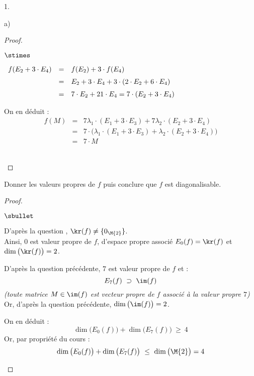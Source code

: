 \documentclass[11pt]{article}%
\begin{document}
\begin{noliste}{1.}
\begin{noliste}{a)}
\begin{proof}
\begin{noliste}{$\stimes$}
      \item $
        \begin{array}[t]{rcl}
          f(E_2 + 3 \cdot E_4) & = & f(E_2) + 3 \cdot f(E_4) 
          \\[.2cm]
          & = & E_2 + 3 \cdot E_4 + 3 \cdot (2 \cdot E_2 + 6 \cdot
          E_4) 
          \\[.2cm]
          & = & 7 \cdot E_2 + 21 \cdot E_4 = 7 \cdot (E_2 + 3 \cdot E_4)
        \end{array}
        $
      \end{noliste}
      On en déduit :
      \[
      \begin{array}{rcl}
        f(M) & = & 7 \lambda_1 \cdot (E_1 + 3 \cdot E_3) + 7 \lambda_2
        \cdot (E_2 + 3 \cdot E_4) 
        \\[.2cm]
        & = & 7 \cdot \Big( \lambda_1 \cdot (E_1 + 3 \cdot E_3) + \lambda_2
        \cdot (E_2 + 3 \cdot E_4) \Big)
        \\[.2cm]
        & = & 7 \cdot M
      \end{array}
      \]




      ~\\[-1.6cm]
    \end{proof}

  \item Donner les valeurs propres de $f$ puis conclure que $f$ est
    diagonalisable.

    \begin{proof}~%
      \begin{noliste}{$\sbullet$}
      \item D'après la question , $\kr(f) \neq
        \{0_{\M{2}}\}$.\\
        Ainsi, $0$ est valeur propre de $f$, d'espace propre associé
        $E_0(f) = \kr(f)$ et $\dim\big( \kr(f) \big) = 2$.

      \item D'après la question précédente, $7$ est valeur propre de
        $f$ et :
        \[
        E_7(f) \ \supset \ \im(f)
        \]
        {\it (toute matrice $M \in \im(f)$ est vecteur propre de $f$
          associé à la valeur propre $7$)}\\
        Or, d'après la question précédente, $\dim\big( \im(f) \big) = 2$.

      \item On en déduit : 
        \[
        \dim\big( E_0(f) \big) + \dim\big( E_7(f) \big) \ \geq \ 4
        \]
        Or, par propriété du cours : 
        \[
        \dim\big( E_0(f) \big) + \dim\big( E_7(f) \big) \ \leq \
        \dim\big( \M{2} \big) = 4
        \]


\end{noliste}
\end{proof}
\end{noliste}
\end{noliste}
\end{document}
